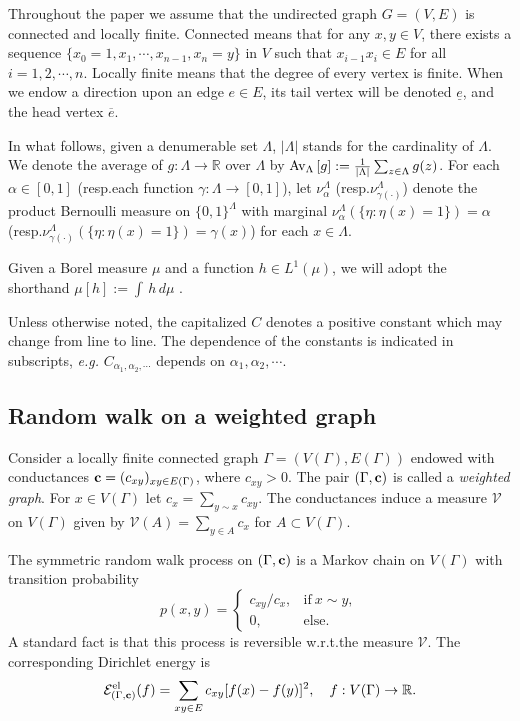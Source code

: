 \documentclass[11pt]{amsart}
\theoremstyle{plain}
\theoremstyle{definition}
\theoremstyle{remark}
\begin{document}
Throughout the paper we assume that the undirected graph $G=(V,E)$ is connected and locally finite. 
Connected means that for any $x, y\in V$, there exists a sequence $\{x_0=1, x_1, \cdots, x_{n-1}, x_n=y\}$ in $V$ such that $x_{i-1} x_i \in E$ for all $i=1,2,\cdots, n$.
Locally finite means that the degree of every vertex is finite.
When we endow a direction upon an edge $e\in E$, its tail vertex will be denoted $\underline{e}$, and the head vertex $\overline{e}$.

In what follows, given a denumerable set $\Lambda$, $|\Lambda|$ stands for the cardinality of $\Lambda$. We denote the average of $g: \Lambda\to\mathbb{R}$ over $\Lambda$ by ${{\rm Av}_{{\Lambda}}\left[{{g}}\right]} := \frac{1}{|\Lambda|}\sum_{z\in \Lambda} g(z)$. For each $\alpha\in [0,1]$ (resp.\@ each function $\gamma: \Lambda \to [0,1]$), let $\nu_\alpha^\Lambda$ (resp.\@ $\nu_{\gamma(\cdot)}^\Lambda$) denote the product Bernoulli measure on $\{0,1\}^\Lambda$ with marginal $\nu_\alpha^\Lambda\left(\{\eta: \eta(x)=1\}\right)=\alpha$ (resp.\@ $\nu_{\gamma(\cdot)}^\Lambda\left(\{\eta:\eta(x)=1\}\right)=\gamma(x)$) for each $x\in \Lambda$.

Given a Borel measure $\mu$ and a function $h\in L^1(\mu)$, we will adopt the shorthand $\mu[h] := \int\, h\,d\mu$ . 

Unless otherwise noted, the capitalized $C$ denotes a positive constant which may change from line to line. The dependence of the constants is indicated in subscripts, \emph{e.g.} $C_{\alpha_1, \alpha_2, \cdots}$ depends on $\alpha_1, \alpha_2, \cdots$. 
 
\subsection{Random walk on a weighted graph}

Consider a locally finite connected graph $\Gamma= (V(\Gamma), E(\Gamma))$ endowed with conductances ${\bf c} = (c_{xy})_{xy\in E(\Gamma)}$, where $c_{xy} > 0$. The pair $(\Gamma, {\bf c})$ is called a \emph{weighted graph}. For $x\in V(\Gamma)$ let $c_x = \sum_{y\sim x} c_{xy}$. The conductances induce a measure $\mathcal{V}$ on $V(\Gamma)$ given by 
$
\mathcal{V}(A) = \sum_{y\in A} c_x
$
for $A\subset V(\Gamma)$. 

The symmetric random walk process on $(\Gamma, {\bf c})$ is a Markov chain on $V(\Gamma)$ with transition probability
\[
p(x,y) = \left\{\begin{array}{ll} c_{xy}/c_x, & \text{if}~x\sim y,\\ 0, &\text{else}.\end{array}\right.
\]
A standard fact is that this process is reversible w.r.t.\@ the measure $\mathcal{V}$. The corresponding Dirichlet energy is
\[
\mathcal{E}^{\rm el}_{(\Gamma,{\bf c})}(f) = \sum_{xy\in E} c_{xy} [f(x)-f(y)]^2,\quad f: V(\Gamma)\to\mathbb{R}.
\]
\end{document}
